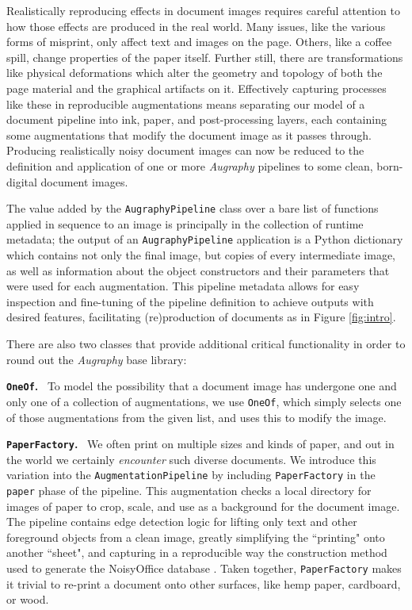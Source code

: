 \documentclass[runningheads]{llncs}
\begin{document}
Realistically reproducing effects in document images requires careful attention to how those effects are produced in the real world.
Many issues, like the various forms of misprint, only affect text and images on the page.
Others, like a coffee spill, change properties of the paper itself. Further still, there are transformations like physical deformations which alter the geometry and topology of both the page material and the graphical artifacts on it.
Effectively capturing processes like these in reproducible augmentations means separating our model of a document pipeline into ink, paper, and post-processing layers, each containing some augmentations that modify the document image as it passes through.
Producing realistically noisy document images can now be reduced to the definition and application of one or more \emph{Augraphy} pipelines to some clean, born-digital document images.

The value added by the \texttt{AugraphyPipeline} class over a bare list of functions applied in sequence to an image is principally in the collection of runtime metadata; the output of an \texttt{AugraphyPipeline} application is a Python dictionary which contains not only the final image, but copies of every intermediate image, as well as information about the object constructors and their parameters that were used for each augmentation.
 This pipeline metadata allows for easy inspection and fine-tuning of the pipeline definition to achieve outputs with desired features, facilitating (re)production of documents as in Figure \ref{fig:intro}.

\sectionfont{\keepall}
There are also two classes that provide additional critical functionality in order to round out the \emph{Augraphy} base library:

\noindent\textbf{\texttt{OneOf}.} ~To model the possibility that a document image has undergone one and only one of a collection of augmentations, we use \texttt{OneOf}, which simply selects one of those augmentations from the given list, and uses this to modify the image.

\sectionfont{\normalfont}
\noindent\textbf{\texttt{PaperFactory}.} ~We often print on multiple sizes and kinds of paper, and out in the world we certainly \textit{encounter} such diverse documents.
We introduce this variation into the \texttt{AugmentationPipeline} by including \texttt{PaperFactory} in the \texttt{paper} phase of the pipeline.
This augmentation checks a local directory for images of paper to crop, scale, and use as a background for the document image.
The pipeline contains edge detection logic for lifting only text and other foreground objects from a clean image, greatly simplifying the ``printing" onto another ``sheet", and capturing in a reproducible way the construction method used to generate the NoisyOffice database \cite{ref_NoisyOfficeDatabase}.
Taken together, \texttt{PaperFactory} makes it trivial to re-print a document onto other surfaces, like hemp paper, cardboard, or wood.
\end{document}
